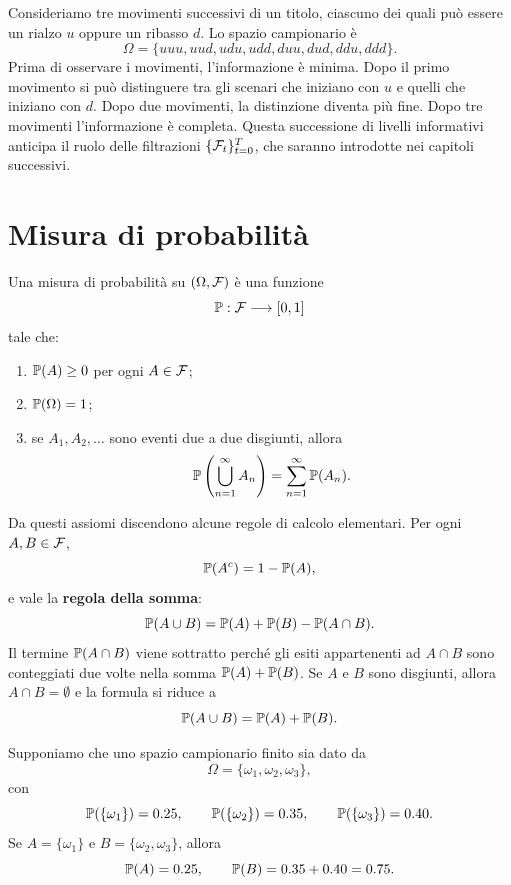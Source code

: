 \begin{example}
Consideriamo tre movimenti successivi di un titolo, ciascuno dei quali pu\`{o}
essere un rialzo $u$ oppure un ribasso $d$. Lo spazio campionario \`{e}
\[
\Omega=\{uuu,uud,udu,udd,duu,dud,ddu,ddd\}.
\]
Prima di osservare i movimenti, l'informazione \`{e} minima. Dopo il primo
movimento si pu\`{o} distinguere tra gli scenari che iniziano con $u$ e quelli
che iniziano con $d$. Dopo due movimenti, la distinzione diventa pi\`{u} fine.
Dopo tre movimenti l'informazione \`{e} completa. Questa successione di
livelli informativi anticipa il ruolo delle filtrazioni $\{\F%
_{t}\}_{t=0}^{T}$, che saranno introdotte nei capitoli successivi.
\end{example}

\section{Misura di probabilit\`{a}}

\begin{definition}
Una misura di probabilit\`{a} su $(\Omega,\mathcal{F})$ \`{e} una funzione
\[
\mathbb{P}:\mathcal{F}\longrightarrow\lbrack0,1]
\]
tale che:

\begin{enumerate}
\item $\mathbb{P}(A)\geq0$ per ogni $A\in\mathcal{F}$;

\item $\mathbb{P}(\Omega)=1$;

\item se $A_{1},A_{2},\ldots$ sono eventi due a due disgiunti, allora
\[
\mathbb{P}\left(  \bigcup_{n=1}^{\infty} A_{n}\right)  = \sum_{n=1}^{\infty
}\mathbb{P}(A_{n}).
\]

\end{enumerate}
\end{definition}

Da questi assiomi discendono alcune regole di calcolo elementari. Per ogni
$A,B\in\mathcal{F}$,
\[
\mathbb{P}(A^{c})=1-\mathbb{P}(A),
\]
e vale la \textbf{regola della somma}:
\[
\mathbb{P}(A\cup B)=\mathbb{P}(A)+\mathbb{P}(B)-\mathbb{P}(A\cap B).
\]
Il termine $\mathbb{P}(A\cap B)$ viene sottratto perch\'{e} gli esiti appartenenti
ad $A\cap B$ sono conteggiati due volte nella somma
$\mathbb{P}(A)+\mathbb{P}(B)$.
Se $A$ e $B$ sono disgiunti, allora $A\cap B=\emptyset$ e la formula si riduce a
\[
\mathbb{P}(A\cup B)=\mathbb{P}(A)+\mathbb{P}(B).
\]


\begin{example}
Supponiamo che uno spazio campionario finito sia dato da
\[
\Omega=\{\omega_{1},\omega_{2},\omega_{3}\},
\]
con
\[
\mathbb{P}(\{\omega_{1}\})=0.25,\qquad\mathbb{P}(\{\omega_{2}\})=0.35,\qquad
\mathbb{P}(\{\omega_{3}\})=0.40.
\]
Se $A=\{\omega_{1}\}$ e $B=\{\omega_{2},\omega_{3}\}$, allora
\[
\mathbb{P}(A)=0.25,\qquad\mathbb{P}(B)=0.35+0.40=0.75.
\]

\end{example}

